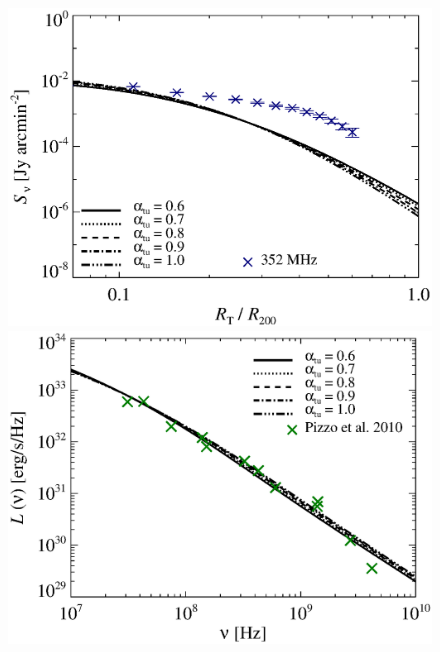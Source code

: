 \documentclass[fleqn,usenatbib,useAMS]{mnras}
\newcommand{\Mflatturb}{{\it M-turbulence}\xspace}
\begin{document}
\begin{figure}
\begin{minipage}{1\columnwidth}
\begin{center}
   \end{center}
\end{minipage}
\\
\begin{minipage}{1\columnwidth}
  \begin{center}%
    \includegraphics[width=\columnwidth]{tcltD.prof.comp.KrTTDth.aI0.eps}
  \end{center}
\end{minipage}
\begin{minipage}{1\columnwidth}
   \begin{center}%
     \includegraphics[width=\columnwidth]{tcltD.spec.comp.KrTTDth.aI0.eps}

\end{center}
\end{minipage}
\end{figure}
\end{document}
